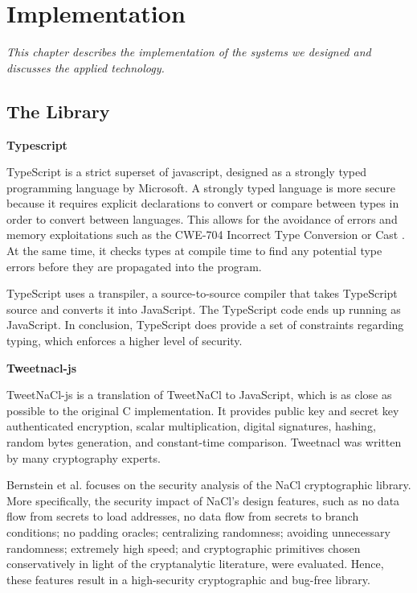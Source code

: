 \chapter{Implementation} \label{chap:System_implementation}
\textit{This chapter describes the implementation of the systems we designed and discusses the applied technology.}

\minitoc

\section{The Library}
\bigskip
{\textbf{Typescript}}

TypeScript is a strict superset of javascript, designed as a strongly typed programming language by Microsoft. A strongly typed language is more secure because it requires explicit declarations to convert or compare between types in order to convert between languages. This allows for the avoidance of errors and memory exploitations such as the CWE-704 Incorrect Type Conversion or Cast \cite{cwe}. At the same time, it checks types at compile time to find any potential type errors before they are propagated into the program.

TypeScript uses a transpiler, a source-to-source compiler that takes TypeScript source and converts it into JavaScript. The TypeScript code ends up running as JavaScript. In conclusion, TypeScript does provide a set of constraints regarding typing, which enforces a higher level of security.

\bigskip
{\textbf{Tweetnacl-js}}

TweetNaCl-js is a translation of TweetNaCl to JavaScript, which is as close as possible to the original C implementation. It provides public key and secret key authenticated encryption, scalar multiplication, digital signatures, hashing, random bytes generation, and constant-time comparison. Tweetnacl was written by many cryptography experts.

Bernstein et al. \cite{Bernstein2012} focuses on the security analysis of the NaCl cryptographic library.
More specifically, the security impact of NaCl's design features, such as no data flow
from secrets to load addresses, no data flow from secrets to branch conditions; no padding oracles; centralizing randomness; avoiding unnecessary randomness; extremely high speed; and cryptographic primitives chosen conservatively in light of the cryptanalytic literature, were evaluated. Hence, these features result in a high-security cryptographic and bug-free library.


